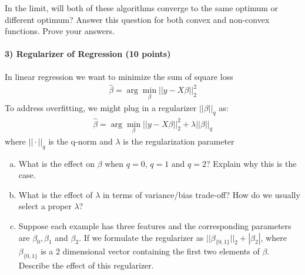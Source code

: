 \documentclass[11pt]{article}
\begin{document}
In the limit, will both of these algorithms converge to the same optimum or different optimum? Answer this question for both convex and non-convex functions. Prove your answers.

\paragraph{3) Regularizer of Regression (10 points)}
In linear regression we want to minimize the sum of square loss
\begin{align}
\hat{\beta}=\arg\!\min\limits_{\beta}||y-X\beta||_2^2
\end{align}
To address overfitting, we might plug in a regularizer $||\beta||_q$ as:
\begin{align}
\hat{\beta}=\arg\!\min\limits_{\beta}||y-X\beta||_2^2+\lambda||\beta||_q
\end{align}
where $||\cdot||_q$ is the q-norm and $\lambda$ is the regularization parameter
\begin{enumerate}[(a)]
\item
What is the effect on $\beta$ when $q=0$, $q=1$ and $q=2$? Explain why this is the case.
\item
What is the effect of $\lambda$ in terms of variance/bias trade-off? How do we usually select a proper $\lambda$?
\item
Suppose each example has three features and the corresponding parameters are $\beta_0,\beta_1$ and $\beta_2$. If we formulate the regularizer as $||\beta_{\{0,1\}}||_2+|\beta_2|$, where $\beta_{\{0,1\}}$ is a 2 dimensional vector containing the first two elements of $\beta$. Describe the effect of this regularizer.
\end{enumerate}
\end{document}
